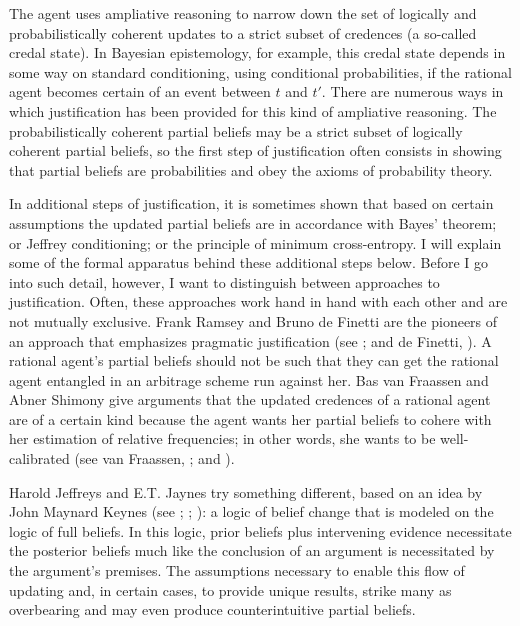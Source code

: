 \documentclass[smallextended]{svjour3}       %
\begin{document}
The agent uses ampliative reasoning to narrow down the set of
logically and probabilistically coherent updates to a strict subset of
credences (a so-called credal state). In Bayesian epistemology, for
example, this credal state depends in some way on standard
conditioning, using conditional probabilities, if the rational agent
becomes certain of an event between $t$ and $t'$. There are numerous
ways in which justification has been provided for this kind of
ampliative reasoning. The probabilistically coherent partial beliefs
may be a strict subset of logically coherent partial beliefs, so the
first step of justification often consists in showing that partial
beliefs are probabilities and obey the axioms of probability theory.

In additional steps of justification, it is sometimes shown that based
on certain assumptions the updated partial beliefs are in accordance
with Bayes' theorem; or Jeffrey conditioning; or the principle of
minimum cross-entropy. I will explain some of the formal apparatus
behind these additional steps below. Before I go into such detail,
however, I want to distinguish between approaches to justification.
Often, these approaches work hand in hand with each other and are not
mutually exclusive. Frank Ramsey and Bruno de Finetti are the pioneers
of an approach that emphasizes pragmatic justification (see
; and de Finetti, ). A
rational agent's partial beliefs should not be such that they can get
the rational agent entangled in an arbitrage scheme run against her.
Bas van Fraassen and Abner Shimony give arguments that the updated
credences of a rational agent are of a certain kind because the agent
wants her partial beliefs to cohere with her estimation of relative
frequencies; in other words, she wants to be well-calibrated (see van
Fraassen, ; and ).

Harold Jeffreys and E.T. Jaynes try something different, based on an
idea by John Maynard Keynes (see ;
; ): a logic of belief
change that is modeled on the logic of full beliefs. In this logic,
prior beliefs plus intervening evidence necessitate the posterior
beliefs much like the conclusion of an argument is necessitated by the
argument's premises. The assumptions necessary to enable this flow of
updating and, in certain cases, to provide unique results, strike many
as overbearing and may even produce counterintuitive partial beliefs.
\end{document}
